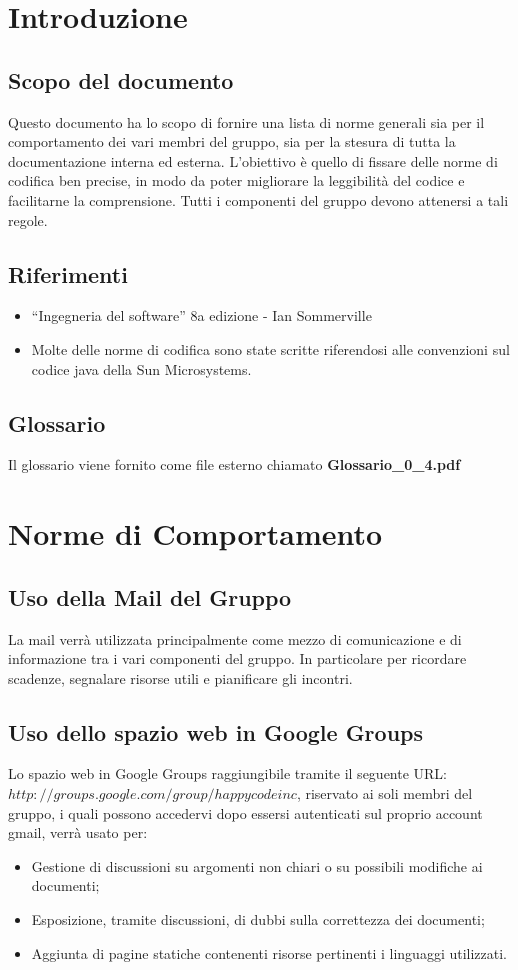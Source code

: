 \documentclass[11pt,titlepage,a4paper]{report}
\begin{document}
\tableofcontents %

\chapter{Introduzione}
\section{Scopo del documento}
Questo documento ha lo scopo di fornire una lista di norme generali sia per il comportamento dei vari membri del gruppo, sia per la stesura di tutta la documentazione interna ed esterna. L'obiettivo \`e quello di fissare delle norme di codifica ben precise, in modo da poter migliorare la leggibilit\`a del codice e facilitarne la comprensione. Tutti i componenti del gruppo devono attenersi a tali regole.
\section{Riferimenti}
\begin{itemize}
\item ``Ingegneria del software'' 8a edizione - Ian Sommerville 
\item Molte delle norme di codifica sono state scritte riferendosi alle convenzioni sul codice java della Sun Microsystems.
\end{itemize}
\section{Glossario}
Il glossario viene fornito come file esterno chiamato \textbf {Glossario\_0\_4.pdf} 

\chapter{Norme di Comportamento}
\section{Uso della Mail del Gruppo}
La mail verr\`a utilizzata principalmente come mezzo di comunicazione e di informazione tra i vari componenti del gruppo. In particolare per ricordare scadenze, segnalare risorse utili e pianificare gli incontri. 
\section{Uso dello spazio web in Google Groups}
Lo spazio web in Google Groups raggiungibile tramite il seguente URL: \({http://groups.google.com/group/happycodeinc}\), riservato ai soli membri del gruppo, i quali possono accedervi dopo essersi autenticati sul proprio account gmail, verr\`a usato per:
\begin{itemize}
\item Gestione di discussioni su argomenti non chiari o su possibili modifiche ai documenti;
\item Esposizione, tramite discussioni, di dubbi sulla correttezza dei documenti;
\item Aggiunta di pagine statiche contenenti risorse pertinenti i linguaggi utilizzati.
\end{itemize}
\end{document}

